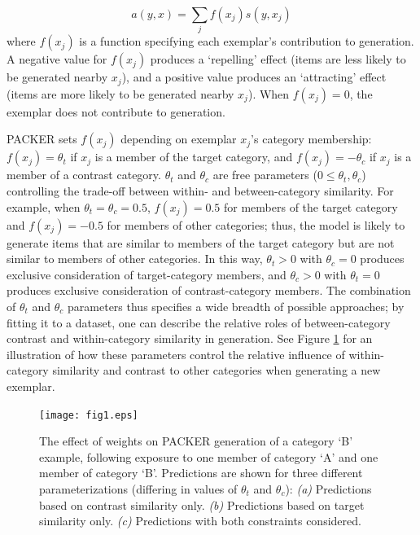 \documentclass[pdflatex,sn-apa]{sn-jnl}%
\theoremstyle{thmstyleone}%
\theoremstyle{thmstyletwo}%
\theoremstyle{thmstylethree}%
\begin{document}
\begin{equation} a(y, x) = \sum_j{f(x_j) s(y, x_j)}
\end{equation}
% 
where $f(x_j)$ is a function specifying each exemplar's contribution to
generation. A negative value for $f(x_j)$ produces a `repelling' effect (items
are less likely to be generated nearby $x_j$), and a positive value produces an
`attracting' effect (items are more likely to be generated nearby $x_j$). When
$f(x_j)=0$, the exemplar does not contribute to generation.

PACKER sets $f(x_j)$ depending on exemplar $x_j$'s category membership:
$f(x_j) = \theta_t$ if $x_j$ is a member of the target category, and
$f(x_j) = -\theta_c$ if $x_j$ is a member of a contrast category. $\theta_t$ and
$\theta_c$ are free parameters ($0 \leq \theta_t,\theta_c$) controlling the
trade-off between within- and between-category similarity. For example, when
$\theta_t = \theta_c = 0.5$, $f(x_j) = 0.5$ for members of the target category
and $f(x_j) = -0.5$ for members of other categories; thus, the model is likely
to generate items that are similar to members of the target category but are not
similar to members of other categories. In this way, $\theta_t > 0$ with
$\theta_c = 0$ produces exclusive consideration of target-category members, and
$\theta_c > 0$ with $\theta_t = 0$ produces exclusive consideration of
contrast-category members. The combination of $\theta_t$ and $\theta_c$
parameters thus specifies a wide breadth of possible approaches; by fitting it
to a dataset, one can describe the relative roles of between-category contrast
and within-category similarity in generation. See Figure
\ref{fig:packer-examples} for an illustration of how these parameters control
the relative influence of within-category similarity and contrast to other
categories when generating a new exemplar.

\begin{figure}
	\begin{center} 
    \texttt{[image: fig1.eps]}
      \caption{The effect of weights on PACKER generation of a category `B' example, following exposure
        to one member of category `A' and one member of category `B'.
        Predictions are shown for three different parameterizations (differing
        in values of $\theta_t$ and $\theta_c$): {\em (a)}
        Predictions based on contrast similarity only. {\em (b)}
        Predictions based on target similarity only. {\em (c)} Predictions with
        both constraints considered.}
		\label{fig:packer-examples}
	\end{center}
\end{figure}
\end{document}
